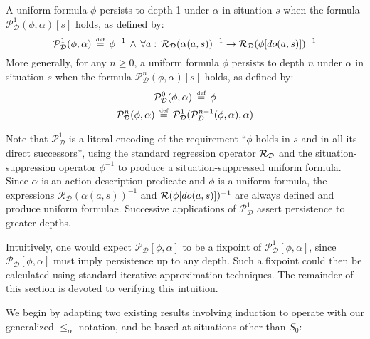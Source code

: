 \begin{defnL}
 A uniform formula $\phi$ persists
to depth 1 under $\alpha$ in situation $s$ when the formula $\mathcal{P}_{\mathcal{D}}^{1}(\phi,\alpha)[s]$
holds, as defined by:\label{def:persists-depth-n}\[
\mathcal{P}_{\mathcal{D}}^{1}(\phi,\alpha)\,\stackrel{\mbox{\tiny def}}{=}\,\phi^{-1}\,\wedge\,\forall a:\,\mathcal{R_{D}}(\alpha(a,s))^{-1}\rightarrow\mathcal{R}_{\mathcal{D}}(\phi[do(a,s)])^{-1}\]
 More generally, for any $n\geq0$, a uniform formula $\phi$ persists
to depth $n$ under $\alpha$ in situation $s$ when the formula $\mathcal{P}_{\mathcal{D}}^{n}(\phi,\alpha)[s]$
holds, as defined by:\begin{gather*}
\mathcal{P}_{\mathcal{D}}^{0}(\phi,\alpha)\,\stackrel{\mbox{\tiny def}}{=}\,\phi\\
\mathcal{P}_{\mathcal{D}}^{n}(\phi,\alpha)\,\stackrel{\mbox{\tiny def}}{=}\,\mathcal{P}_{\mathcal{D}}^{1}(\mathcal{P}_{D}^{n-1}(\phi,\alpha),\alpha)\end{gather*}

\end{defnL}
Note that $\mathcal{P}_{\mathcal{D}}^{1}$ is a literal encoding of
the requirement {}``$\phi$ holds in $s$ and in all its direct successors'',
using the standard regression operator $\mathcal{R}_{\mathcal{D}}$ and the situation-suppression
operator $\phi^{-1}$ to produce a situation-suppressed uniform formula.
Since $\alpha$ is an action description predicate and $\phi$ is
a uniform formula, the expressions $\mathcal{R_{D}}(\alpha(a,s))^{-1}$
and $\mathcal{R}(\phi[do(a,s)])^{-1}$ are always defined and produce uniform
formulae. Successive applications of $\mathcal{P}_{\mathcal{D}}^{1}$
assert persistence to greater depths.

Intuitively, one would expect $\mathcal{P}_{\mathcal{D}}[\phi,\alpha]$
to be a fixpoint of $\mathcal{P}_{\mathcal{D}}^{1}[\phi,\alpha]$,
since $\mathcal{P}_{\mathcal{D}}[\phi,\alpha]$ must imply persistence
up to any depth. Such a fixpoint could then be calculated using standard
iterative approximation techniques. The remainder of this section
is devoted to verifying this intuition.

We begin by adapting two existing results involving induction to operate
with our generalized $\leq_{\alpha}$ notation, and be based at situations
other than $S_{0}$:

